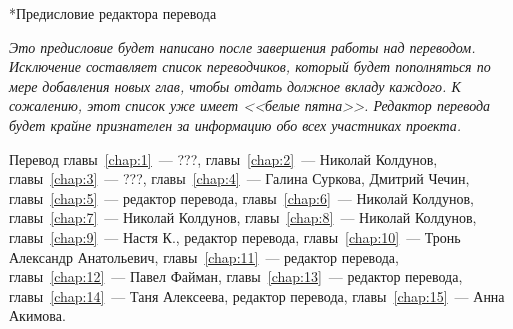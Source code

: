 
\begin{chapter}*{Предисловие редактора перевода}

\textit{Это предисловие будет написано после завершения работы над переводом.
Исключение составляет список переводчиков, который будет пополняться
по мере добавления новых глав, чтобы отдать должное вкладу каждого.
К сожалению, этот список уже имеет <<белые пятна>>. Редактор
перевода будет крайне признателен за информацию обо всех участниках проекта.}

\bigskip 

Перевод главы~\ref{chap:1}~--- ???, главы~\ref{chap:2}~--- Николай Колдунов,
главы~\ref{chap:3}~--- ???, главы~\ref{chap:4}~--- Галина Суркова, 
Дмитрий Чечин, главы~\ref{chap:5}~--- редактор перевода, 
главы~\ref{chap:6}~--- Николай Колдунов, 
главы~\ref{chap:7}~--- Николай Колдунов,
главы~\ref{chap:8}~--- Николай Колдунов,
главы~\ref{chap:9}~--- Настя К., редактор перевода,
главы~\ref{chap:10}~--- Тронь Александр Анатольевич,
главы~\ref{chap:11}~--- редактор перевода,
главы~\ref{chap:12}~--- Павел Файман,
главы~\ref{chap:13}~--- редактор перевода,
главы~\ref{chap:14}~--- Таня Алексеева, редактор перевода,
главы~\ref{chap:15}~--- Анна Акимова.
\end{chapter}